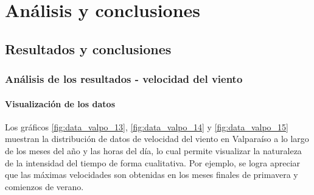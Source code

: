 
\chapter{Análisis y conclusiones}

\section{Resultados y conclusiones}
\subsection{Análisis de los resultados - velocidad del viento}
\subsubsection{Visualización de los datos}
Los gráficos \ref{fig:data_valpo_13}, \ref{fig:data_valpo_14} y \ref{fig:data_valpo_15} muestran la distribución de datos de velocidad del viento en Valparaíso a lo largo de los meses del año y las horas del día, lo cual permite visualizar la naturaleza de la intensidad del tiempo de forma cualitativa.
Por ejemplo, se logra apreciar que las máximas velocidades son obtenidas en los meses finales de primavera y comienzos de verano.\\
